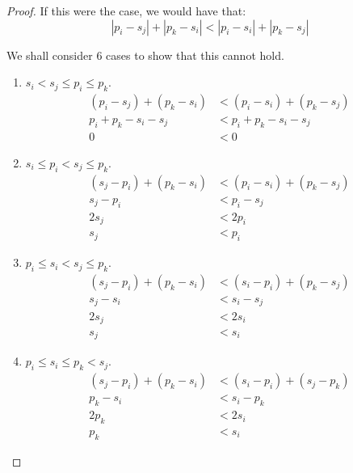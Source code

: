 \documentclass{article}
\begin{document}
\begin{enumerate}[label=(\alph*)]
\begin{proof}
            If this were the case, we would have that:
            $$ |p_i - s_j| + |p_k - s_i| < |p_i - s_i| + |p_k - s_j| $$
            
            We shall consider 6 cases to show that this cannot hold.
            \begin{enumerate}[label=Case \arabic*.]
                \item $ s_i < s_j \leq p_i \leq p_k $.
                \begin{align*}
                    (p_i - s_j) + (p_k - s_i) &< (p_i - s_i) + (p_k - s_j)\\
                    p_i + p_k - s_i - s_j &< p_i + p_k - s_i - s_j\\
                    0 &< 0
                \end{align*}
                
                \item $ s_i \leq p_i < s_j \leq p_k $.
                \begin{align*}
                    (s_j - p_i) + (p_k - s_i) &< (p_i - s_i) + (p_k - s_j)\\
                    s_j - p_i &< p_i - s_j\\
                    2s_j &< 2p_i\\
                    s_j &< p_i 
                \end{align*}
                
                \item $ p_i \leq s_i < s_j \leq p_k $.
                \begin{align*}
                    (s_j - p_i) + (p_k - s_i) &< (s_i - p_i) + (p_k - s_j)\\
                    s_j - s_i &< s_i - s_j\\
                    2s_j &< 2s_i\\
                    s_j &< s_i
                \end{align*}
                
                \item $ p_i \leq s_i \leq p_k < s_j $.
                \begin{align*}
                    (s_j - p_i) + (p_k - s_i) &< (s_i - p_i) + (s_j - p_k)\\
                    p_k - s_i &< s_i - p_k\\
                    2p_k &< 2s_i\\
                    p_k &< s_i
                \end{align*}
                

\end{enumerate}
\end{proof}
\end{enumerate}
\end{document}
